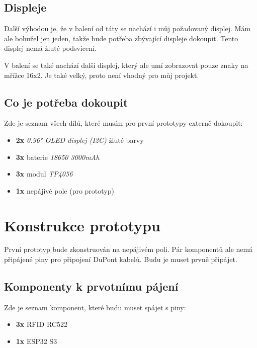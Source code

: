 \documentclass[11pt,a4paper]{article}
\begin{document}
\subsection{Displeje}
Další výhodou je, že v balení od táty se nachází i můj požadovaný displej. Mám ale bohužel jen jeden, takže bude potřeba zbývající displeje dokoupit. Tento displej nemá žluté podsvícení.

\noindent V balení se také nachází další displej, který ale umí zobrazovat pouze znaky na mřížce 16x2. Je také velký, proto není vhodný pro můj projekt.

\subsection{Co je potřeba dokoupit}
Zde je seznam všech dílů, které musím pro první prototypy externě dokoupit:
\begin{itemize}
    \item \textbf{2x} \textit{0.96" OLED displej (I2C)} žluté barvy
    \item \textbf{3x} baterie \textit{18650 3000mAh}
    \item \textbf{3x} modul \textit{TP4056}
    \item \textbf{1x} nepájivé pole (pro prototyp)
\end{itemize}

\section{Konstrukce prototypu}
První prototyp bude zkonstruován na nepájivém poli. Pár komponentů ale nemá 
připájené piny pro připojení DuPont kabelů. Budu je muset prvně připájet.

\subsection{Komponenty k prvotnímu pájení}
Zde je seznam komponent, které budu muset spájet s piny: 
\begin{itemize}
  \item \textbf{3x} RFID RC522
  \item \textbf{1x} ESP32 S3
\end{itemize}
\end{document}
